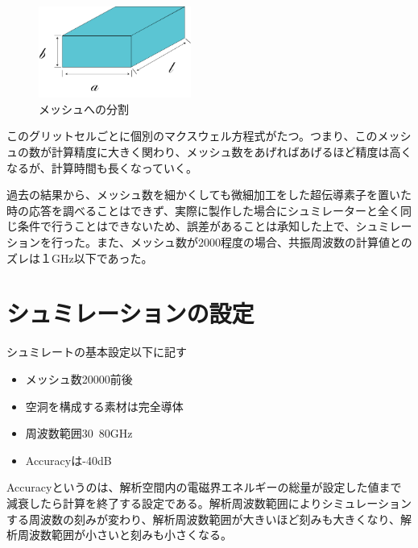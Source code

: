 \vspace{10 mm}

\begin{figure}[h]
  \begin{center}
    \includegraphics[width=5cm]{./image/空洞共振器.png}
    \caption{メッシュへの分割}
    \label{fig:Mesh}
  \end{center}
\end{figure}

このグリットセルごとに個別のマクスウェル方程式がたつ。つまり、このメッシュの数が計算精度に大きく関わり、メッシュ数をあげればあげるほど精度は高くなるが、計算時間も長くなっていく。

過去の結果から、メッシュ数を細かくしても微細加工をした超伝導素子を置いた時の応答を調べることはできず、実際に製作した場合にシュミレーターと全く同じ条件で行うことはできないため、誤差があることは承知した上で、シュミレーションを行った。また、メッシュ数が2000程度の場合、共振周波数の計算値とのズレは１GHz以下であった。

\section{シュミレーションの設定}
シュミレートの基本設定以下に記す

\begin{itemize}
  \item メッシュ数20000前後
  \item 空洞を構成する素材は完全導体
  \item 周波数範囲30~80GHz
  \item Accuracyは-40dB
\end{itemize}

Accuracyというのは、解析空間内の電磁界エネルギーの総量が設定した値まで減衰したら計算を終了する設定である。解析周波数範囲によりシミュレーションする周波数の刻みが変わり、解析周波数範囲が大きいほど刻みも大きくなり、解析周波数範囲が小さいと刻みも小さくなる。
